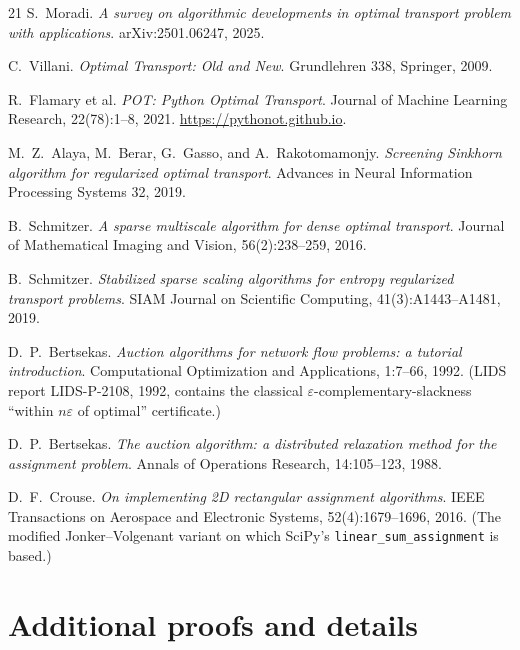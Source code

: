 \documentclass[11pt]{article}
\theoremstyle{remark}
\begin{document}
\begin{thebibliography}{21}
S.~Moradi. \emph{A survey on algorithmic developments in optimal transport
problem with applications}. arXiv:2501.06247, 2025.

C.~Villani. \emph{Optimal Transport: Old and New}. Grundlehren 338,
Springer, 2009.

R.~Flamary et al. \emph{POT: Python Optimal Transport}.
Journal of Machine Learning Research, 22(78):1--8, 2021.
\url{https://pythonot.github.io}.

M.~Z.~Alaya, M.~Berar, G.~Gasso, and A.~Rakotomamonjy. \emph{Screening
Sinkhorn algorithm for regularized optimal transport}. Advances in Neural
Information Processing Systems 32, 2019.

B.~Schmitzer. \emph{A sparse multiscale algorithm for dense optimal
transport}. Journal of Mathematical Imaging and Vision, 56(2):238--259,
2016.

B.~Schmitzer. \emph{Stabilized sparse scaling algorithms for entropy
regularized transport problems}. SIAM Journal on Scientific Computing,
41(3):A1443--A1481, 2019.

D.~P.~Bertsekas. \emph{Auction algorithms for network flow problems: a
tutorial introduction}. Computational Optimization and Applications,
1:7--66, 1992. (LIDS report LIDS-P-2108, 1992, contains the classical
$\varepsilon$-complementary-slackness ``within $n\varepsilon$ of optimal''
certificate.)

D.~P.~Bertsekas. \emph{The auction algorithm: a distributed relaxation
method for the assignment problem}. Annals of Operations Research,
14:105--123, 1988.

D.~F.~Crouse. \emph{On implementing 2D rectangular assignment algorithms}.
IEEE Transactions on Aerospace and Electronic Systems, 52(4):1679--1696,
2016. (The modified Jonker--Volgenant variant on which SciPy's
\texttt{linear\_sum\_assignment} is based.)

\end{thebibliography}

\appendix

\section{Additional proofs and details}
\label{app:proofs}
\end{document}
